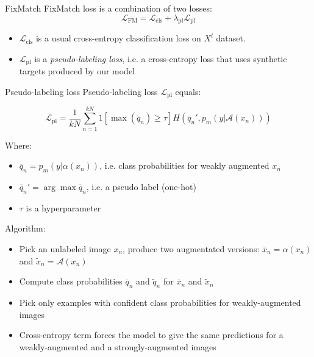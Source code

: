 \documentclass[10pt]{beamer}
\begin{document}
\begin{frame}{FixMatch}
    \pause
    FixMatch loss is a combination of two losses:
    \begin{equation}
        \mathcal{L}_\text{FM} = \mathcal{L}_\text{cls} + \lambda_\text{pl}\mathcal{L}_\text{pl}
    \end{equation}
    \begin{itemize}
        \item\pause $\mathcal{L}_\text{cls}$ is a usual cross-entropy classification loss on $X^l$ dataset.
        \item\pause $\mathcal{L}_\text{pl}$ is a \textit{pseudo-labeling loss}, i.e. a cross-entropy loss that uses synthetic targets produced by our model
    \end{itemize}
\end{frame}

\begin{frame}{Pseudo-labeling loss}
\pause
Pseudo-labeling loss $\mathcal{L}_\text{pl}$ equals:

\begin{equation}
\mathcal{L}_\text{pl} = \frac{1}{kN} \sum_{n=1}^{kN} 1\left[\max \left(\bar{q}_n\right) \geq \tau\right] H\left(\bar{q}_{n}', p_m\left(y | \mathcal{A}\left(x_{n}\right)\right)\right)
\end{equation}

Where:
\begin{itemize}
    \item $\bar{q}_n = p_m(y | \alpha(x_n))$, i.e. class probabilities for weakly augmented $x_n$
    \item $\bar{q}_n' = \arg\max \bar{q}_n$, i.e. a pseudo label (one-hot)
    \item $\tau$ is a hyperparameter
\end{itemize}

\pause
Algorithm:
\begin{itemize}
    \item\pause Pick an unlabeled image $x_n$, produce two augmentated versions: $\bar{x}_n = \alpha(x_n)$ and $\tilde{x}_n = \mathcal{A}(x_n)$
    \item\pause Compute class probabilities $\bar{q}_n$ and $\tilde{q}_n$ for $\bar{x}_n$ and $\tilde{x}_n$
    \item\pause Pick only examples with confident class probabilities for weakly-augmented images
    \item\pause Cross-entropy term forces the model to give the same predictions for a weakly-augmented and a strongly-augmented images
\end{itemize}
\end{frame}
\end{document}
